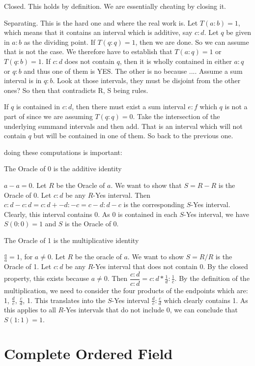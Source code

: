 \documentclass[12pt]{article}
\theoremstyle{remark}
\begin{document}
Closed. This holds by definition. We are essentially cheating by closing it. 

Separating. This is the hard one and where the real work is. Let $T(a:b) = 1$, which means that it contains an interval which is additive, say $c:d$. Let $q$ be given in $a:b$ as the dividing point. If $T(q:q) = 1$, then we are done. So we can assume that is not the case. We therefore have to establish that $T(a:q)=1$ or $T(q:b) = 1$. If $c:d$ does not contain $q$, then it is wholly contained in either $a:q$ or $q:b$ and thus one of them is YES. The other is no because .... Assume a sum interval is in $q:b$. Look at those intervals, they must be disjoint from the other ones? So then that contradicts R, S being rules. 

If $q$ is contained in $c:d$, then there must exist a sum interval $e:f$ which $q$ is not a part of since we are assuming $T(q:q)=0$. Take the intersection of the underlying summand intervals and then add. That is an interval which will not contain $q$ but will be contained in one of them. So back to the previous one. 



doing these computations is important:

The Oracle of 0 is the additive identity

$a-a = 0$. Let $R$ be the Oracle of $a$. We want to show that $S= R-R$ is the Oracle of 0. Let $c:d$ be any $R$-Yes interval. Then $c:d-c:d = c:d+ -d:-c = c-d:d-c$ is the corresponding $S$-Yes interval. Clearly, this interval contains 0. As 0 is contained in each $S$-Yes interval, we have $S(0:0)=1$ and $S$ is the Oracle of 0. 

The Oracle of 1 is the multiplicative identity

$\tfrac{a}{a} = 1$, for $a \neq 0$. Let $R$ be the oracle of $a$. We want to show $S=R/R$ is the Oracle of 1. Let $c:d$ be any $R$-Yes interval that does not contain 0. By the closed property, this exists because $a \neq 0$. Then $\dfrac{c:d}{c:d} = c:d * \tfrac{1}{d}:\tfrac{1}{c}$. By the definition of the multiplication, we need to consider the four products of the endpoints which are: 1, $\tfrac{d}{c}$, $\tfrac{c}{d}$, 1. This translates into the $S$-Yes interval $\tfrac{d}{c}:\tfrac{c}{d}$ which clearly contains 1. As this applies to all $R$-Yes intervals that do not include 0, we can conclude that $S(1:1) =1$.



\section{Complete Ordered Field}
\end{document}
